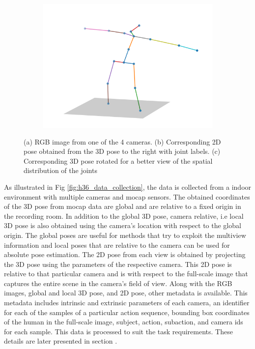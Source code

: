\begin{figure}
\begin{subfigure}[b]{0.3\textwidth}
        \caption{}
    \end{subfigure}
    \hfill
    \begin{subfigure}[b]{0.3\textwidth}
        \centering
        \includegraphics[width=\textwidth]{figures/h36_viz/h363d.png}
        \caption{}
    \end{subfigure}

    \caption{(a) RGB image from one of the 4 cameras. (b) Corresponding 2D pose obtained from the 3D pose to the right with joint labels. (c) Corresponding 3D pose rotated for a better view of the spatial distribution of the joints}

    \label{fig:h36_sample}
\end{figure}

As illustrated in Fig \ref{fig:h36_data_collection}, the data is collected from a indoor environment with multiple cameras and \ac{mocap} sensors. The obtained coordinates of the 3D pose from \ac{mocap} data are global and are relative to a fixed origin in the recording room. In addition to the global 3D pose, camera relative, i.e local 3D pose is also obtained using the camera's location with respect to the global origin. The global poses are useful for methods that try to exploit the multiview information and local poses that are relative to the camera can be used for absolute pose estimation. The 2D pose from each view is obtained by projecting the 3D pose using the parameters of the respective camera. This 2D pose is relative to that particular camera and is with respect to the full-scale image that captures the entire scene in the camera's field of view. Along with the RGB images, global and local 3D pose, and 2D pose, other metadata is available. This metadata includes intrinsic and extrinsic parameters of each camera, an identifier for each of the samples of a particular action sequence, bounding box coordinates of the human in the full-scale image, subject, action, subaction, and camera ids for each sample. This data is processed to suit the task requirements. These details are later presented in section .

